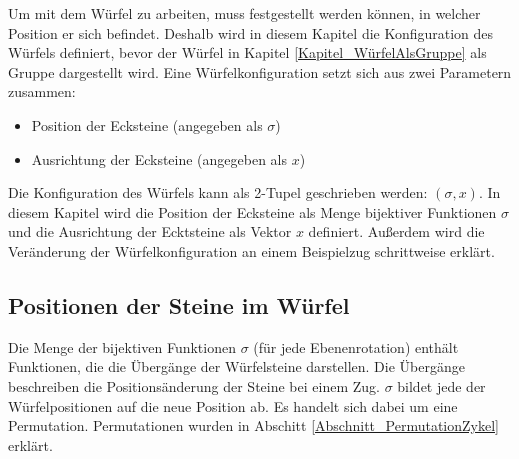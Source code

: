 \documentclass[12pt,a4paper, usenames, dvipsnames]{article}
\theoremstyle{mystyle}
\theoremstyle{definition}
\begin{document}
\label{Kapitel_KonfigurationDesWürfels}

Um mit dem Würfel zu arbeiten, muss festgestellt werden können, in welcher Position er sich befindet.
Deshalb wird in diesem Kapitel die Konfiguration des Würfels definiert, bevor der Würfel in Kapitel \ref{Kapitel_WürfelAlsGruppe} als Gruppe dargestellt wird. Eine Würfelkonfiguration setzt sich aus zwei Parametern zusammen: 
\begin{itemize}
\item Position der Ecksteine (angegeben als $\sigma$)
\item Ausrichtung der Ecksteine (angegeben als $x$)
\end{itemize}
Die Konfiguration des Würfels kann als 2-Tupel geschrieben werden: $(\sigma, x)$.
In diesem Kapitel wird die Position der Ecksteine als Menge bijektiver Funktionen $\sigma$ und die Ausrichtung der Ecktsteine als Vektor $x$ definiert. Außerdem wird die Veränderung der Würfelkonfiguration an einem Beispielzug schrittweise erklärt.

%
%
%
%
%
%
%
%
%
%
%
%
%
%
%
%
%
%
%
%

\subsection{Positionen der Steine im Würfel} 

\label{Abschnitt_PositionenDerSteineImWürfel}

Die Menge der bijektiven Funktionen $\sigma$ (für jede Ebenenrotation) enthält Funktionen, die die Übergänge der Würfelsteine darstellen. Die Übergänge beschreiben die Positionsänderung der Steine bei einem Zug. $\sigma$ bildet jede der Würfelpositionen auf die neue Position ab. Es handelt sich dabei um eine Permutation. Permutationen wurden in Abschitt \ref{Abschnitt_PermutationZykel} erklärt. 
\end{document}
